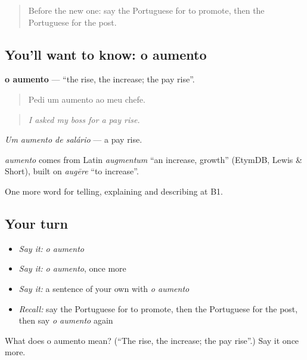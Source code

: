 \begin{quote}
Before the new one: say the Portuguese for to promote, then the Portuguese for the post.
\end{quote}

\subsection*{You'll want to know: o aumento}
\textbf{o aumento} — \textquotedblleft{}the rise, the increase; the pay rise\textquotedblright{}.

\begin{quote}
Pedi um aumento ao meu chefe.
\end{quote}

\begin{quote}
\emph{I asked my boss for a pay rise.}
\end{quote}

\emph{Um aumento de salário} — a pay rise.

\begin{cousinweb}
\emph{aumento} comes from Latin \emph{augmentum} \textquotedblleft{}an increase, growth\textquotedblright{} (EtymDB, Lewis \& Short), built on \emph{augēre} \textquotedblleft{}to increase\textquotedblright{}.
\end{cousinweb}

\begin{grammarlens}[title={What you've built}]
One more word for telling, explaining and describing at B1.
\end{grammarlens}

\subsection*{Your turn}
\begin{itemize}
\raggedright
  \item \emph{Say it:} \emph{o aumento}
  \item \emph{Say it:} \emph{o aumento}, once more
  \item \emph{Say it:} a sentence of your own with \emph{o aumento}
  \item \emph{Recall:} say the Portuguese for to promote, then the Portuguese for the post, then say \emph{o aumento} again
\end{itemize}

\begin{tcolorbox}[breakable,colback=teal!4,colframe=teal!35!black,title={Before you move on}]
What does o aumento mean? (\textquotedblleft{}The rise, the increase; the pay rise\textquotedblright{}.) Say it once more.
\end{tcolorbox}
